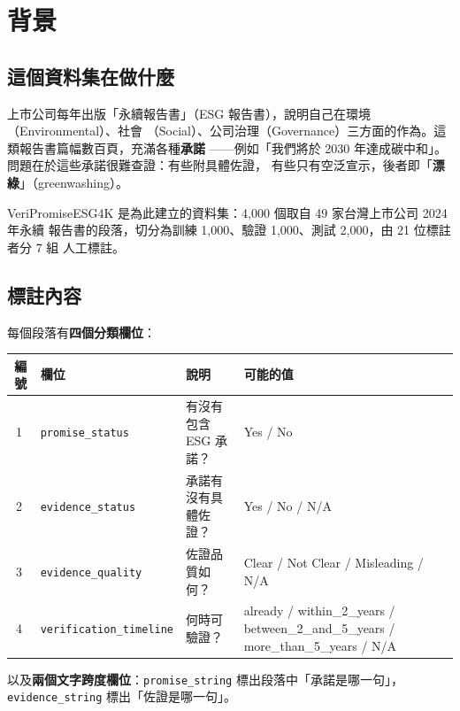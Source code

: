 \documentclass[11pt,a4paper]{ctexart}
\newcommand{\fn}[1]{\texttt{#1}}
\begin{document}
\tableofcontents
\newpage

\section{背景}

\subsection{這個資料集在做什麼}

上市公司每年出版「永續報告書」（ESG 報告書），說明自己在環境（Environmental）、社會
（Social）、公司治理（Governance）三方面的作為。這類報告書篇幅數百頁，充滿各種\textbf{承諾}
——例如「我們將於 2030 年達成碳中和」。問題在於這些承諾很難查證：有些附具體佐證，
有些只有空泛宣示，後者即「\textbf{漂綠}」（greenwashing）。

VeriPromiseESG4K 是為此建立的資料集：4{,}000 個取自 49 家台灣上市公司 2024 年永續
報告書的段落，切分為訓練 1{,}000、驗證 1{,}000、測試 2{,}000，由 21 位標註者分 7 組
人工標註。

\subsection{標註內容}

每個段落有\textbf{四個分類欄位}：

\begin{table}[h]
\centering\small
\begin{tabular}{@{}clp{4.2cm}p{5.2cm}@{}}
\toprule
編號 & 欄位 & 說明 & 可能的值 \\
\midrule
\textcircled{1} & \fn{promise\_status} & 有沒有包含 ESG 承諾？ & Yes / No \\
\textcircled{2} & \fn{evidence\_status} & 承諾有沒有具體佐證？ & Yes / No / N/A \\
\textcircled{3} & \fn{evidence\_quality} & 佐證品質如何？ & Clear / Not Clear / Misleading / N/A \\
\textcircled{4} & \fn{verification\_timeline} & 何時可驗證？ & already / within\_2\_years / between\_2\_and\_5\_years / more\_than\_5\_years / N/A \\
\bottomrule
\end{tabular}
\end{table}

以及\textbf{兩個文字跨度欄位}：\fn{promise\_string} 標出段落中「承諾是哪一句」，
\fn{evidence\_string} 標出「佐證是哪一句」。
\end{document}
